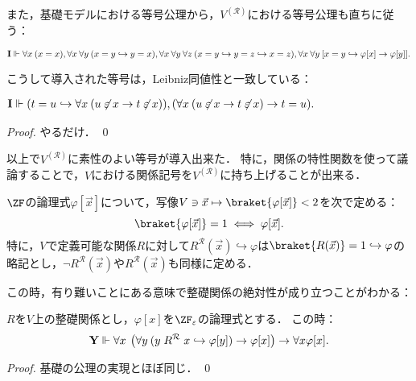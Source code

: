 \documentclass[realisability.tex]{subfiles}
\begin{document}
また，基礎モデルにおける等号公理から，$V^{(\mathcal{R})}$における等号公理も直ちに従う：

\begin{lemma}
 \[
  \mathsf{\mathbf{I}} \Vdash \forall x \: (x = x),
            \forall x \: \forall y\: (x = y \hookrightarrow y = x),
            \forall x \: \forall y\: \forall z \: (x = y \hookrightarrow y = z \hookrightarrow x = z),
            \forall x \: \forall y\:
                [x = y \hookrightarrow \varphi[x] \to \varphi[y]].
 \]
\end{lemma}

こうして導入された等号は，Leibniz同値性と一致している：

\begin{lemma}
 $\begin{aligned}
   \mathsf{\mathbf{I}} \Vdash (t = u \hookrightarrow \forall x\: (u \not\mathrel{\varepsilon} x \to t \not\mathrel{\varepsilon} x)),
            (\forall x \:(u \not\mathrel{\varepsilon} x \to t \not\mathrel{\varepsilon} x) \to t = u ).
 \end{aligned}$
\end{lemma}
\begin{proof}
 やるだけ． \qed
\end{proof}

以上で$V^{(\mathcal{R})}$に素性のよい等号が導入出来た．
特に，関係の特性関数を使って議論することで，$V$における関係記号を$V^{(\mathcal{R})}$に持ち上げることが出来る．

\begin{definition}
 $\ZF$の論理式$\varphi[\vec{x}]$について，写像$V \ni \vec{x} \mapsto \braket{\varphi[\vec{x}]} < 2$を次で定める：
 \[
  \braket{ \varphi[\vec{x}] } = 1 \iff \varphi[\vec{x}].
 \]
 特に，$V$で定義可能な関係$R$に対して$R^{\mathcal{R}}(\vec{x})\hookrightarrow \varphi$は$\braket{R(\vec{x})} = 1 \hookrightarrow \varphi$の略記とし，$\neg R^{\mathcal{R}}(\vec{x})$や$R^{\mathcal{R}}(\vec{x})$も同様に定める．
\end{definition}

この時，有り難いことにある意味で整礎関係の絶対性が成り立つことがわかる：

\begin{lemma}\label{lem:wf-pres}
 $R$を$V$上の整礎関係とし，$\varphi[x]$を$\ZF_{\varepsilon}$の論理式とする．
 この時：
 \[
  \mathsf{\mathbf{Y}} \Vdash \forall x\: \left(\forall y\: (y \mathrel{R^{\mathcal{R}}} x \hookrightarrow \varphi[y]) \to \varphi[x] \right) \to \forall x \varphi[x].
 \]
\end{lemma}
\begin{proof}
 基礎の公理の実現とほぼ同じ． \qed
\end{proof}
\end{document}
